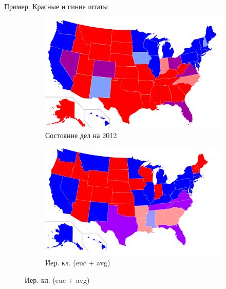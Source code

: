 \documentclass[aspectratio=169]{beamer}
\begin{document}
\begin{frame}{Пример. Красные и синие штаты}

\begin{center}
\begin{figure}
\begin{subfigure}[b]{.45\linewidth}
\includegraphics[width=1.0\textwidth]{images/redblue.png}
\caption{Состояние дел на 2012}
\end{subfigure}
\begin{subfigure}[b]{.45\linewidth}
\includegraphics[width=1.0\textwidth]{images/map_hc.png}
\caption{Иер. кл. (euc + avg)}
\end{subfigure}
\end{figure}
\end{center}

\end{frame}
\end{document}
